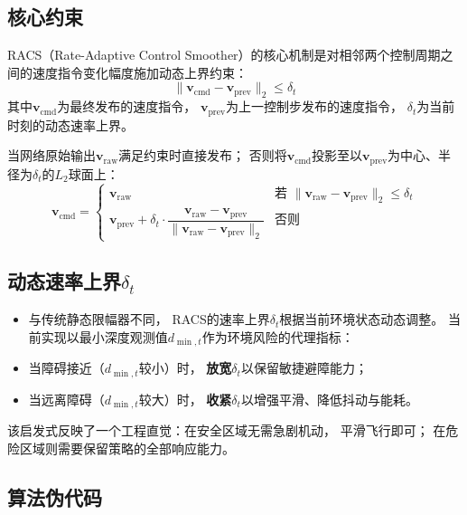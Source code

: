 \subsection{核心约束}

RACS（Rate-Adaptive Control Smoother）的核心机制是对相邻两个控制周期之间的速度指令变化幅度施加动态上界约束：
\begin{equation}
  \|\mathbf{v}_{\text{cmd}} - \mathbf{v}_{\text{prev}}\|_2 \leq \delta_t
  \label{eq:racs_constraint}
\end{equation}
其中$\mathbf{v}_{\text{cmd}}$为最终发布的速度指令，
$\mathbf{v}_{\text{prev}}$为上一控制步发布的速度指令，
$\delta_t$为当前时刻的动态速率上界。

当网络原始输出$\mathbf{v}_{\text{raw}}$满足约束时直接发布；
否则将$\mathbf{v}_{\text{cmd}}$投影至以$\mathbf{v}_{\text{prev}}$为中心、半径为$\delta_t$的$L_2$球面上：
\begin{equation}
  \mathbf{v}_{\text{cmd}} = \begin{cases}
    \mathbf{v}_{\text{raw}} & \text{若 } \|\mathbf{v}_{\text{raw}} - \mathbf{v}_{\text{prev}}\|_2 \leq \delta_t \\
    \mathbf{v}_{\text{prev}} + \delta_t \cdot \dfrac{\mathbf{v}_{\text{raw}} - \mathbf{v}_{\text{prev}}}{\|\mathbf{v}_{\text{raw}} - \mathbf{v}_{\text{prev}}\|_2} & \text{否则}
  \end{cases}
  \label{eq:racs_projection}
\end{equation}

\subsection{动态速率上界$\delta_t$}

\begin{itemize}
\item 与传统静态限幅器不同，
RACS的速率上界$\delta_t$根据当前环境状态动态调整。
当前实现以最小深度观测值$d_{\min,t}$作为环境风险的代理指标：
\item 当障碍接近（$d_{\min,t}$较小）时，
\textbf{放宽}$\delta_t$以保留敏捷避障能力；
 \item 当远离障碍（$d_{\min,t}$较大）时，
\textbf{收紧}$\delta_t$以增强平滑、降低抖动与能耗。
 \end{itemize}

该启发式反映了一个工程直觉：在安全区域无需急剧机动，
平滑飞行即可；
在危险区域则需要保留策略的全部响应能力。

\subsection{算法伪代码}


